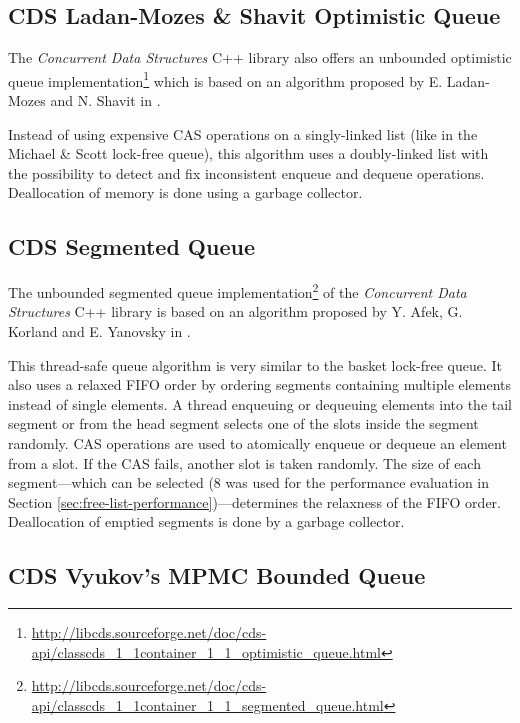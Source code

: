 \subsection[CDS OptimisticQueue]{CDS Ladan-Mozes \& Shavit Optimistic Queue} \label{subsec:cds-optimistic}

    The \textit{Concurrent Data Structures} C++ library also offers an unbounded optimistic queue implementation\footnote{\url{http://libcds.sourceforge.net/doc/cds-api/classcds\_1\_1container\_1\_1\_optimistic\_queue.html}} which is based on an algorithm proposed by E. Ladan-Mozes and N. Shavit in \cite{Ladan-Mozes:2004}.

    Instead of using expensive CAS operations on a singly-linked list (like in the Michael \& Scott lock-free queue), this algorithm uses a doubly-linked list with the possibility to detect and fix inconsistent enqueue and dequeue operations. Deallocation of memory is done using a garbage collector.

\subsection[CDS SegmentedQueue]{CDS Segmented Queue} \label{subsec:cds-segmented}

    The unbounded segmented queue implementation\footnote{\url{http://libcds.sourceforge.net/doc/cds-api/classcds\_1\_1container\_1\_1\_segmented\_queue.html}} of the \textit{Concurrent Data Structures} C++ library is based on an algorithm proposed by Y. Afek, G. Korland and E. Yanovsky in \cite{Afek:2010}.

    This thread-safe queue algorithm is very similar to the basket lock-free queue. It also uses a relaxed FIFO order by ordering segments containing multiple elements instead of single elements. A thread enqueuing or dequeuing elements into the tail segment or from the head segment selects one of the slots inside the segment randomly. CAS operations are used to atomically enqueue or dequeue an element from a slot. If the CAS fails, another slot is taken randomly. The size of each segment---which can be selected ($8$ was used for the performance evaluation in Section \ref{sec:free-list-performance})---determines the relaxness of the FIFO order. Deallocation of emptied segments is done by a garbage collector.

\subsection[CDS VyukovMPMCCycleQueue]{CDS Vyukov's MPMC Bounded Queue} \label{subsec:cds-vyukovmpmccycle}

